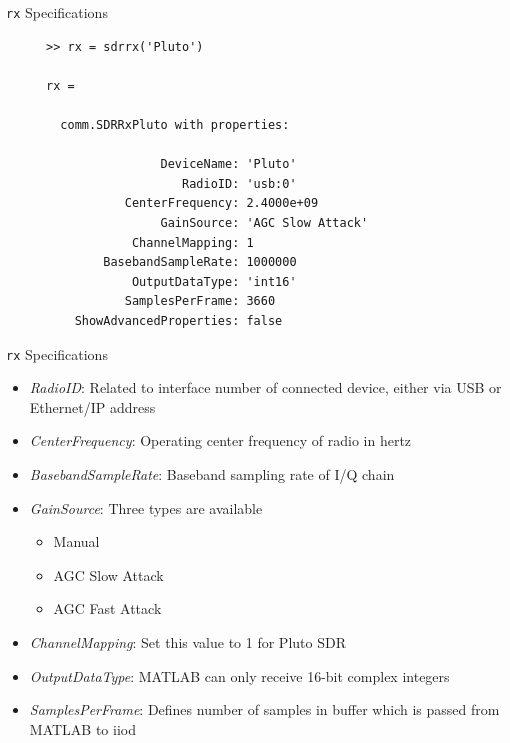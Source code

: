\documentclass[10pt]{beamer}
\begin{document}

\begin{frame}[fragile]{\texttt{rx} Specifications}

\begin{figure}
\centering
\begin{minipage}[framed]{0.9\textwidth}
\begin{lstlisting}
>> rx = sdrrx('Pluto')

rx =

  comm.SDRRxPluto with properties:

                DeviceName: 'Pluto'
                   RadioID: 'usb:0'
           CenterFrequency: 2.4000e+09
                GainSource: 'AGC Slow Attack'
            ChannelMapping: 1
        BasebandSampleRate: 1000000
            OutputDataType: 'int16'
           SamplesPerFrame: 3660
    ShowAdvancedProperties: false
\end{lstlisting}
\end{minipage}
\captionsetup{labelformat=empty}
\end{figure}

\end{frame}


\begin{frame}[fragile]{\texttt{rx} Specifications}

\begin{itemize}
 \item \textit{RadioID}: Related to interface number of connected device, either via USB or Ethernet/IP address
 \item \textit{CenterFrequency}: Operating center frequency of radio in hertz 
 \item \textit{BasebandSampleRate}: Baseband sampling rate of I/Q chain
 \item \textit{GainSource}: Three types are available
 \begin{itemize}
  \item Manual
  \item AGC Slow Attack
  \item AGC Fast Attack
 \end{itemize}
 \item \textit{ChannelMapping}: Set this value to 1 for Pluto SDR
 \item \textit{OutputDataType}: MATLAB can only receive 16-bit complex integers
 \item \textit{SamplesPerFrame}: Defines number of samples in buffer which is passed from MATLAB to iiod
\end{itemize}

 
\end{frame}
\end{document}
